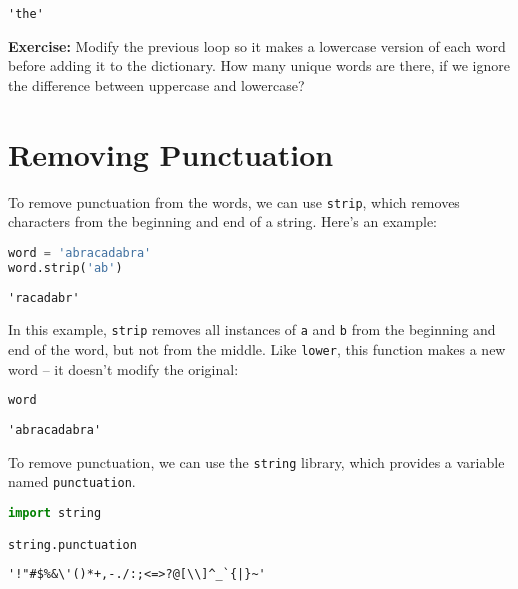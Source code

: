 \begin{lstlisting}[style=output]
'the'
\end{lstlisting}

\textbf{Exercise:} Modify the previous loop so it makes a lowercase
version of each word before adding it to the dictionary. How many unique
words are there, if we ignore the difference between uppercase and
lowercase?

\section{Removing Punctuation}\label{removing-punctuation}

To remove punctuation from the words, we can use
\passthrough{\lstinline!strip!}, which removes characters from the
beginning and end of a string. Here's an example:

\begin{lstlisting}[language=Python,style=source]
word = 'abracadabra'
word.strip('ab')
\end{lstlisting}

\begin{lstlisting}[style=output]
'racadabr'
\end{lstlisting}

In this example, \passthrough{\lstinline!strip!} removes all instances
of \passthrough{\lstinline!a!} and \passthrough{\lstinline!b!} from the
beginning and end of the word, but not from the middle. Like
\passthrough{\lstinline!lower!}, this function makes a new word -- it
doesn't modify the original:

\begin{lstlisting}[language=Python,style=source]
word
\end{lstlisting}

\begin{lstlisting}[style=output]
'abracadabra'
\end{lstlisting}

To remove punctuation, we can use the \passthrough{\lstinline!string!}
library, which provides a variable named
\passthrough{\lstinline!punctuation!}.

\begin{lstlisting}[language=Python,style=source]
import string

string.punctuation
\end{lstlisting}

\begin{lstlisting}[style=output]
'!"#$%&\'()*+,-./:;<=>?@[\\]^_`{|}~'
\end{lstlisting}


